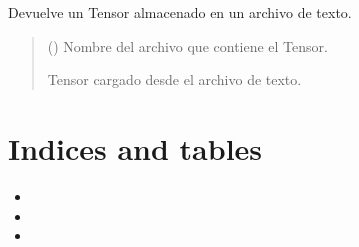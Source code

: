 \documentclass[letterpaper,10pt,english]{sphinxmanual}
\begin{document}
\begin{fulllineitems}
\label{\detokenize{myutils:myutils.tensor.load_tensor}}
\pysigstartsignatures
{}
\pysigstopsignatures
\sphinxAtStartPar
Devuelve un Tensor almacenado en un archivo de texto.
\begin{quote}\begin{description}
\sphinxAtStartPar
{} () \textendash{} Nombre del archivo que contiene el Tensor.

\sphinxAtStartPar
Tensor cargado desde el archivo de texto.

\sphinxAtStartPar
{\hyperref[\detokenize{myutils:myutils.tensor.Tensor}]{}}

\end{description}\end{quote}

\end{fulllineitems}



\chapter{Indices and tables}
\label{\detokenize{index:indices-and-tables}}\begin{itemize}
\item {} 
\sphinxAtStartPar
{}

\item {} 
\sphinxAtStartPar
{}

\item {} 
\sphinxAtStartPar
{}

\end{itemize}


\renewcommand{\indexname}{Python Module Index}
\begin{sphinxtheindex}
\let\bigletter\sphinxstyleindexlettergroup
\bigletter{m}
\item\relax{}
\item\relax{}
\item\relax{}
\item\relax{}
\end{sphinxtheindex}

\renewcommand{\indexname}{Index}
\printindex
\end{document}

